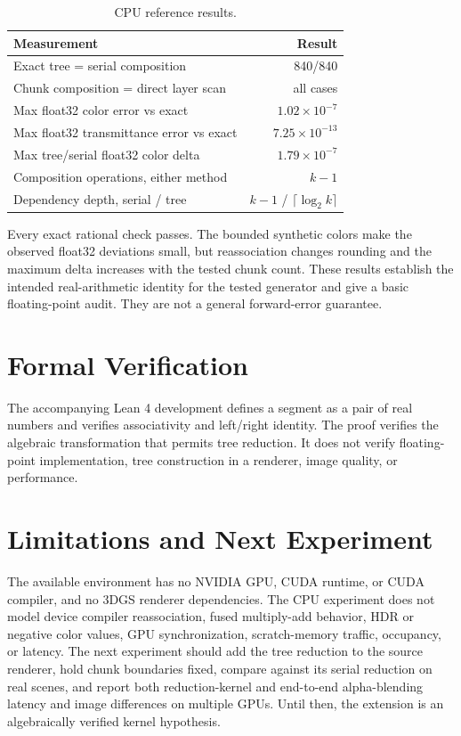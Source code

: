 \documentclass[11pt]{article}
\begin{document}
\begin{table}[t]
\centering
\small
\begin{tabular}{p{4cm}r}
\toprule
Measurement & Result \\
\midrule
Exact tree = serial composition & 840/840 \\
Chunk composition = direct layer scan & all cases \\
Max float32 color error vs exact & $1.02\times10^{-7}$ \\
Max float32 transmittance error vs exact & $7.25\times10^{-13}$ \\
Max tree/serial float32 color delta & $1.79\times10^{-7}$ \\
Composition operations, either method & $k-1$ \\
Dependency depth, serial / tree & $k-1$ / $\lceil\log_2k\rceil$ \\
\bottomrule
\end{tabular}
\caption{CPU reference results.}
\label{tab:results}
\end{table}

Every exact rational check passes. The bounded synthetic colors make the observed float32 deviations small, but reassociation changes rounding and the maximum delta increases with the tested chunk count. These results establish the intended real-arithmetic identity for the tested generator and give a basic floating-point audit. They are not a general forward-error guarantee.

\section{Formal Verification}
The accompanying Lean 4 development defines a segment as a pair of real numbers and verifies associativity and left/right identity. The proof verifies the algebraic transformation that permits tree reduction. It does not verify floating-point implementation, tree construction in a renderer, image quality, or performance.

\section{Limitations and Next Experiment}
The available environment has no NVIDIA GPU, CUDA runtime, or CUDA compiler, and no 3DGS renderer dependencies. The CPU experiment does not model device compiler reassociation, fused multiply-add behavior, HDR or negative color values, GPU synchronization, scratch-memory traffic, occupancy, or latency. The next experiment should add the tree reduction to the source renderer, hold chunk boundaries fixed, compare against its serial reduction on real scenes, and report both reduction-kernel and end-to-end alpha-blending latency and image differences on multiple GPUs. Until then, the extension is an algebraically verified kernel hypothesis.
\end{document}

